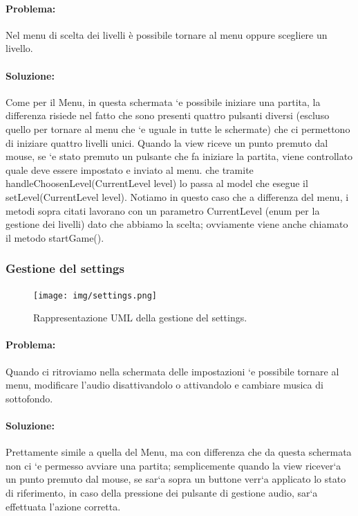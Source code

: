 \documentclass[a4paper,12pt]{report}
\begin{document}
\paragraph{Problema:}
Nel menu di scelta dei livelli è possibile tornare al menu oppure scegliere un livello.

\paragraph{Soluzione:}
Come per il Menu, in questa schermata `e possibile iniziare una partita, la differenza risiede nel fatto che sono presenti quattro pulsanti diversi (escluso quello per tornare al menu che `e uguale in tutte le schermate) che ci permettono di iniziare quattro livelli unici. Quando la view riceve un punto premuto dal mouse, se `e stato premuto un pulsante che fa iniziare la partita, viene controllato quale deve essere impostato e inviato al menu. che tramite handleChoosenLevel(CurrentLevel level) lo passa al model che esegue il setLevel(CurrentLevel level). Notiamo in questo caso che a differenza del menu, i metodi sopra citati lavorano con un parametro CurrentLevel (enum per la gestione dei livelli) dato che abbiamo la scelta; ovviamente viene anche chiamato il metodo startGame().

\subsubsection{Gestione del settings}

\begin{figure}[H]
\centering{}
\texttt{[image: img/settings.png]}
\caption{Rappresentazione UML della gestione del settings.}
\end{figure}

\paragraph{Problema:}
Quando ci ritroviamo nella schermata delle impostazioni `e possibile tornare al menu, modificare l’audio disattivandolo o attivandolo e cambiare musica di sottofondo.

\paragraph{Soluzione:}
Prettamente simile a quella del Menu, ma con differenza che da questa schermata non ci `e permesso avviare una partita; semplicemente quando la view ricever`a un punto premuto dal mouse, se sar`a sopra un buttone verr`a applicato lo stato di riferimento, in caso della pressione dei pulsante di gestione audio, sar`a effettuata l’azione corretta.
\end{document}
